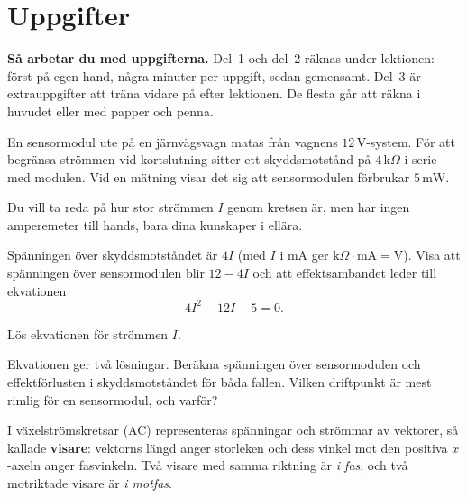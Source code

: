 
\section{Uppgifter}
\label{c7:sec:uppgifter}

\begin{aside}
\textbf{Så arbetar du med uppgifterna.} Del~1 och del~2 räknas under lektionen: först på egen
hand, några minuter per uppgift, sedan gemensamt. Del~3 är extrauppgifter att träna vidare på
efter lektionen. De flesta går att räkna i huvudet eller med papper och penna.

\end{aside}


En sensormodul ute på en järnvägsvagn matas från vagnens $12\,\text{V}$-system. För att begränsa
strömmen vid kortslutning sitter ett skyddsmotstånd på $4\,\text{k}\Omega$ i serie med modulen.
Vid en mätning visar det sig att sensormodulen förbrukar $5\,\text{mW}$.


Du vill ta reda på hur stor strömmen $I$ genom kretsen är, men har ingen amperemeter till hands,
bara dina kunskaper i ellära.
\begin{parts}
  \item Spänningen över skyddsmotståndet är $4I$ (med $I$ i mA ger
    $\text{k}\Omega \cdot \text{mA} = \text{V}$). Visa att spänningen över sensormodulen blir
    $12 - 4I$ och att effektsambandet leder till ekvationen
    \[
      4I^2 - 12I + 5 = 0.
    \]
  \item Lös ekvationen för strömmen $I$.
  \item Ekvationen ger två lösningar. Beräkna spänningen över sensormodulen och effektförlusten i
    skyddsmotståndet för båda fallen. Vilken driftpunkt är mest rimlig för en sensormodul, och
    varför?
\end{parts}

I växelströmskretsar (AC) representeras spänningar och strömmar av vektorer, så kallade
\textbf{visare}: vektorns längd anger storleken och dess vinkel mot den positiva $x$-axeln anger
fasvinkeln. Två visare med samma riktning är \emph{i fas}, och två motriktade visare är \emph{i
motfas}.

